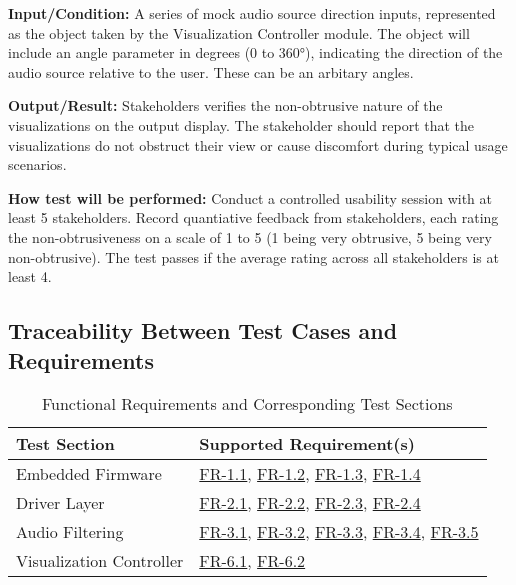 \documentclass[12pt, titlepage]{article}
\begin{document}
\begin{enumerate}
\textbf{Input/Condition:} 
A series of mock audio source direction inputs, represented as the object taken 
by the Visualization Controller module. The object will include an angle 
parameter in degrees (0 to 360°), indicating the direction of the audio source 
relative to the user. These can be an arbitary angles.
					
\textbf{Output/Result:} 
Stakeholders verifies the non-obtrusive nature of the visualizations 
on the output display. The stakeholder should report that the visualizations do 
not obstruct their view or cause discomfort during typical usage scenarios.

\textbf{How test will be performed:} 
Conduct a controlled usability session with at least 5 stakeholders. Record 
quantiative feedback from stakeholders, each rating the non-obtrusiveness on a 
scale of 1 to 5 (1 being very obtrusive, 5 being very non-obtrusive). The test 
passes if the average rating across all stakeholders is at least 4.

\end{enumerate}

\subsection{Traceability Between Test Cases and Requirements}

\begin{table}[H]
\centering
\caption{Functional Requirements and Corresponding Test Sections}
\begin{tabular}{|l|l|}
\hline
\textbf{Test Section} & \textbf{Supported Requirement(s)} \\ \hline
Embedded Firmware & \hyperref[SRS-FR1_1]{FR-1.1}, \hyperref[SRS-FR1_2]{FR-1.2}, \hyperref[SRS-FR1_3]{FR-1.3}, \hyperref[SRS-FR1_4]{FR-1.4} \\ \hline
Driver Layer & \hyperref[SRS-FR2_1]{FR-2.1}, \hyperref[SRS-FR2_2]{FR-2.2}, \hyperref[SRS-FR2_3]{FR-2.3}, \hyperref[SRS-FR2_4]{FR-2.4} \\ \hline
Audio Filtering & \hyperref[SRS-FR3_1]{FR-3.1}, \hyperref[SRS-FR3_2]{FR-3.2}, \hyperref[SRS-FR3_3]{FR-3.3}, \hyperref[SRS-FR3_4]{FR-3.4}, \hyperref[SRS-FR3_5]{FR-3.5} \\ \hline
Visualization Controller & \hyperref[SRS-FR6_1]{FR-6.1}, \hyperref[SRS-FR6_2]{FR-6.2} \\ \hline
\end{tabular}
\end{table}
\end{document}

